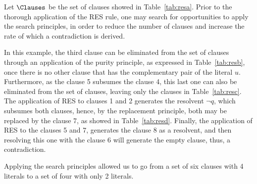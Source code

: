 \begin{example}
    Let $\Clauses$ be the set of clauses showed in Table~\ref{tab:resa}. Prior
    to the thorough application of the RES rule, one may search for
    opportunities to apply the search principles, in order to reduce the
    number of clauses and increase the rate of which a contradiction is derived.

    In this example, the third clause can be eliminated from the set of clauses
    through an application of the purity principle, as expressed in
    Table~\ref{tab:resb}, once there is no other clause that has the
    complementary pair of the literal $u$. 
    Furthermore, as the clause 5 subsumes the clause 4, this last one can also
    be eliminated from the set of clauses, leaving only the clauses in
    Table~\ref{tab:resc}.
    The application of RES to clauses 1 and 2 generates the resolvent
    $\neg q$, which subsumes both clauses, hence, by the replacement principle,
    both may be replaced by the clause 7, as showed in Table~\ref{tab:resd}.
    Finally, the application of RES to the clauses 5 and 7, generates the clause
    8 as a resolvent, and then resolving this one with the clause 6 will
    generate the empty clause, thus, a contradiction. 

    Applying the search principles allowed us to go from a set of six clauses
    with 4 literals to a set of four with only 2 literals.


\end{example}
